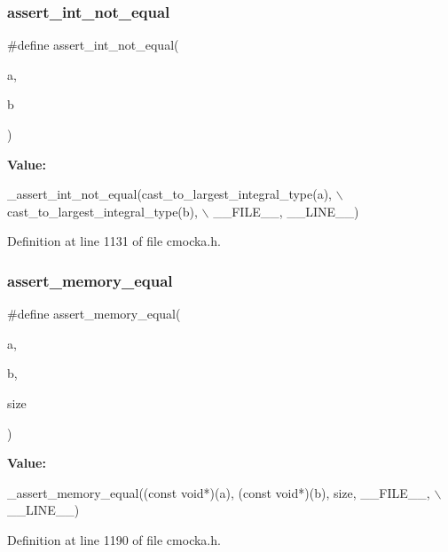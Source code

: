 \subsubsection{\texorpdfstring{assert\+\_\+int\+\_\+not\+\_\+equal}{assert\_int\_not\_equal}}
{\footnotesize\ttfamily \#define assert\+\_\+int\+\_\+not\+\_\+equal(\begin{DoxyParamCaption}\item[{}]{a,  }\item[{}]{b }\end{DoxyParamCaption})}

{\bfseries Value\+:}
\begin{DoxyCode}
\_assert\_int\_not\_equal(cast\_to\_largest\_integral\_type(a), \(\backslash\)
                          cast\_to\_largest\_integral\_type(b), \(\backslash\)
                          \_\_FILE\_\_, \_\_LINE\_\_)
\end{DoxyCode}


Definition at line 1131 of file cmocka.\+h.

\mbox{\label{group__cmocka__asserts_ga0392e6dea107d9c9d897fe7847ab6d19}} 
\subsubsection{\texorpdfstring{assert\+\_\+memory\+\_\+equal}{assert\_memory\_equal}}
{\footnotesize\ttfamily \#define assert\+\_\+memory\+\_\+equal(\begin{DoxyParamCaption}\item[{}]{a,  }\item[{}]{b,  }\item[{}]{size }\end{DoxyParamCaption})}

{\bfseries Value\+:}
\begin{DoxyCode}
\_assert\_memory\_equal((\textcolor{keyword}{const} \textcolor{keywordtype}{void}*)(a), (\textcolor{keyword}{const} \textcolor{keywordtype}{void}*)(b), size, \_\_FILE\_\_, \(\backslash\)
                         \_\_LINE\_\_)
\end{DoxyCode}


Definition at line 1190 of file cmocka.\+h.

\mbox{\label{group__cmocka__asserts_gaca31cdde611bca193f51912c5f3a0d97}} 
